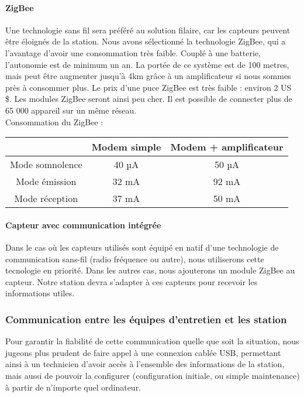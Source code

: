 \paragraph{ZigBee}

Une technologie sans fil sera préféré au solution filaire, car les capteurs peuvent être éloignés de la station. Nous avons sélectionné la technologie ZigBee, qui a l’avantage d’avoir une consommation très faible. Couplé à une batterie, l’autonomie est de minimum un an. 
La portée de ce système est de 100 metres, mais peut être augmenter jusqu’à 4km grâce à un amplificateur si nous sommes près à consommer plus. Le prix d’une puce ZigBee est très faible : environ 2 US \$. Les modules ZigBee seront ainsi peu cher.
Il est possible de connecter plus de 65 000 appareil sur un même réseau.\\

Consommation du ZigBee :

\begin{center}
\begin{tabular}{|c|c|c|}
\hline  & Modem simple & Modem + amplificateur \\ 
\hline Mode somnolence & 40 µA & 50 µA \\ 
\hline Mode émission & 32 mA  & 92 mA \\ 
\hline Mode réception & 37 mA  & 50 mA \\ 
\hline 
\end{tabular} 
\end{center}

\paragraph{Capteur avec communication intégrée}

Dans le cas où les capteurs utilisés sont équipé en natif d’une technologie de communication sans-fil (radio fréquence ou autre), nous utiliserons cette tecnologie en priorité. Dans les autres cas, nous ajouterons un module ZigBee au capteur. Notre station devra s’adapter à ces capteurs pour recevoir les informations utiles.

\subsubsection{Communication entre les équipes d’entretien et les station}

Pour garantir la fiabilité de cette communication quelle que soit la situation, nous jugeons plus prudent de faire appel à une connexion cablée USB, permettant ainsi à un technicien d’avoir accès à l’ensemble des informations de la station, mais aussi de pouvoir la configurer (configuration initiale, ou simple maintenance) à partir de n’importe quel ordinateur.

